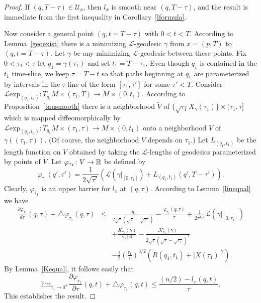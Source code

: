 \begin{proof}\sketch
{}
If $(q,T-\tau)\in {\mathcal U}_{x}$, then $l_x$ is smooth near $(q,T-\tau)$,
and the result is immediate from the first inequality in
Corollary~\ref{lformula}.


Now consider a general point $(q,t=T-\tau)$ with $0<t<T$. According to
Lemma~\ref{geoexist} there is  a minimizing ${\mathcal L}$-geodesic $\gamma$
from $x=(p,T)$ to $(q,t=T-\tau)$. Let $\gamma$ be any minimizing ${\mathcal
L}$-geodesic between these points. Fix $0<\tau_1<\tau$ let $q_1=\gamma(\tau_1)$
and set $t_1=T-\tau_1$. Even though $q_1$ is contained in the $t_1$ time-slice,
we keep $\tau=T-t$ so that paths beginning at $q_1$ are parameterized by
intervals in the $\tau$-line of the form $[\tau_1,\tau']$ for some $\tau'<T$.
Consider ${\mathcal L}\mathrm{exp}_{(q_1,t_1)}\colon T_{q_1}M\times (\tau_1,T)\to
M\times (0,t_1)$. According to Proposition~\ref{tausmooth} there is a
neighborhood $\widetilde V$ of $\{\sqrt{\tau_1}X_\gamma(\tau_1)\}\times
(\tau_1,\tau]$ which is mapped diffeomorphically  by ${\mathcal L}\mathrm{exp}_{(q_1,t_1)}\colon T_{q_1}M\times (\tau_1,\tau)\to M\times (0,t_1)$ onto a
neighborhood $V$ of $\gamma((\tau_1,\tau))$. (Of course, the neighborhood $V$
depends on $\tau_1$.) Let $L_{(q_1,t_1)}$ be the length function on $V$
obtained by taking the ${\mathcal L}$-lengths of geodesics parameterized by
points of $\widetilde V$. Let $\varphi_{\tau_1}\colon V\to \mathbb{R}$ be defined by
$$\varphi_{\tau_1}(q',\tau')=\frac{1}{2\sqrt{\tau'}}\left({\mathcal
L}(\gamma|_{[0,\tau_1]})+L_{(q_1,t_1)}(q',T-\tau')\right).$$
Clearly, $\varphi_{\tau_1}$ is an upper barrier for $l_x$ at
$(q,\tau)$. According to Lemma~\ref{linequal} we have
\begin{eqnarray*}
\frac{\partial \varphi_{\tau_1}}{d\tau}(q,\tau)+\triangle
\varphi_{\tau_1}(q,\tau) & \le &
\frac{n}{2\sqrt{\tau}(\sqrt{\tau}-\sqrt{\tau_1})}-\frac{\varphi_{\tau_1}(q,\tau)}{\tau}
+\frac{1}{2\tau^{3/2}}{\mathcal L}(\gamma|_{[0,\tau_1]})\\
& & +\frac{K^{\tau}_{\tau_1}(\gamma)}{2\tau^{3/2}}-\frac{{\mathcal
K}_{\tau_1}^{\tau}(\gamma)}{2\sqrt{\tau}(\sqrt{\tau}-\sqrt{\tau_1})^{2}}
\\ & & -\frac{1}{2}\left(\frac{\tau_1}{\tau}\right)^{3/2}\left(R(q_1,t_1)+|X(\tau_1)|^2\right).
\end{eqnarray*}
By Lemma~\ref{Kequal},  it follows easily that
$$\mathrm{lim}_{\tau_1\rightarrow 0^+}
\frac{\partial \varphi_{\tau_1}}{\partial \tau}(q,t)+\triangle
\varphi_{\tau_1}(q,t)\le \frac{(n/2)-l_x(q,t)}{\tau}.$$ This
establishes the result.
\end{proof}

